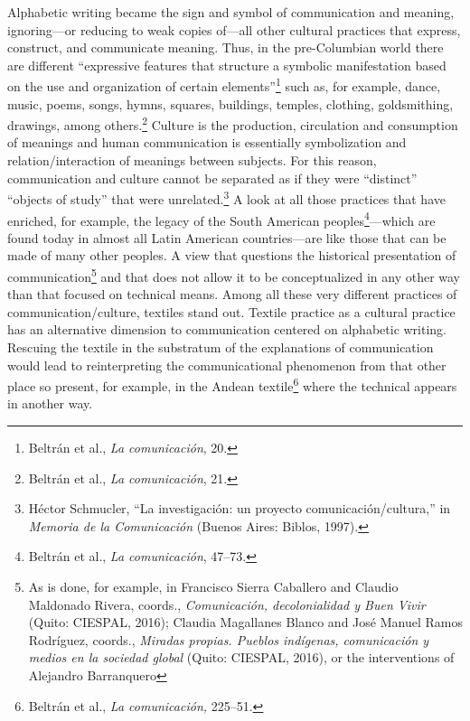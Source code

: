 \documentclass{tufte-handout}
\begin{document}
Alphabetic writing became the sign and symbol of communication and
meaning, ignoring---or reducing to weak copies of---all other cultural
practices that express, construct, and communicate meaning. Thus, in the
pre-Columbian world there are different ``expressive features that
structure a symbolic manifestation based on the use and organization of
certain elements''\footnote{Beltrán et al., \emph{La comunicación}, 20.}
such as, for example, dance, music, poems, songs, hymns, squares,
buildings, temples, clothing, goldsmithing, drawings, among
others.\footnote{Beltrán et al., \emph{La comunicación}, 21.} Culture is
the production, circulation and consumption of meanings and human
communication is essentially symbolization and relation/interaction of
meanings between subjects. For this reason, communication and culture
cannot be separated as if they were ``distinct'' ``objects of study''
that were unrelated.\footnote{Héctor Schmucler, ``La investigación: un
  proyecto comunicación/cultura,'' in \emph{Memoria de la Comunicación}
  (Buenos Aires: Biblos, 1997).} A look at all those practices that have
enriched, for example, the legacy of the South American
peoples\footnote{Beltrán et al., \emph{La comunicación}, 47--73.}---which
are found today in almost all Latin American countries---are like those
that can be made of many other peoples. A view that questions the
historical presentation of communication\footnote{As is done, for
  example, in Francisco Sierra Caballero and Claudio Maldonado Rivera,
  coords., \emph{Comunicación, decolonialidad y Buen Vivir} (Quito:
  CIESPAL, 2016); Claudia Magallanes Blanco and José Manuel Ramos
  Rodríguez, coords., \emph{Miradas propias. Pueblos indígenas,
  comunicación y medios en la sociedad global} (Quito: CIESPAL, 2016),
  or the interventions of Alejandro Barranquero} and that does not allow it to be conceptualized in any
other way than that focused on technical means. Among all these very
different practices of communication/culture, textiles stand out.
Textile practice as a cultural practice has an alternative dimension to
communication centered on alphabetic writing. Rescuing the textile in
the substratum of the explanations of communication would lead to
reinterpreting the communicational phenomenon from that other place so
present, for example, in the Andean textile\footnote{Beltrán et al.,
  \emph{La comunicación,} 225--51.} where the technical appears in
another way.
\end{document}
